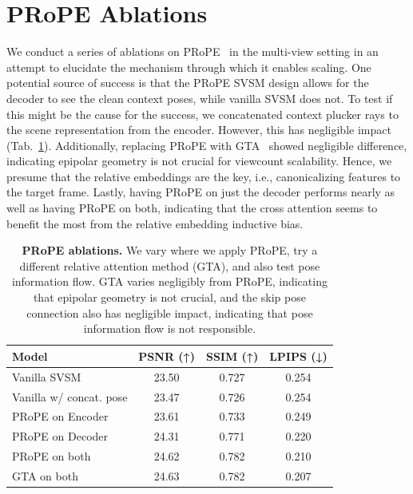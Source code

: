 \section{PRoPE Ablations}

We conduct a series of ablations on PRoPE~\cite{li2025cameras} in the multi-view setting in an attempt to elucidate the mechanism through which it enables scaling. One potential source of success is that the PRoPE SVSM design allows for the decoder to see the clean context poses, while vanilla SVSM does not. To test if this might be the cause for the success, we concatenated context plucker rays to the scene representation from the encoder. However, this has negligible impact (Tab.~\ref{tab:prope-abl-1}). Additionally, replacing PRoPE with GTA~\cite{miyato2023gta} showed negligible difference, indicating epipolar geometry is not crucial for viewcount scalability. Hence, we presume that the relative embeddings are the key, i.e., canonicalizing features to the target frame. Lastly, having PRoPE on just the decoder performs nearly as well as having PRoPE on both, indicating that the cross attention seems to benefit the most from the relative embedding inductive bias.

\begin{table}[h]
\footnotesize
\centering
\begin{tabular}{lccc}
\toprule
\textbf{Model} & \textbf{PSNR} (↑) & \textbf{SSIM} (↑) & \textbf{LPIPS} (↓)\\
\midrule
Vanilla SVSM & 23.50 & 0.727 & 0.254 \\
Vanilla w/ concat. pose & 23.47 & 0.726 & 0.254 \\
\midrule
PRoPE on Encoder & 23.61 & 0.733 & 0.249 \\
PRoPE on Decoder & 24.31 & 0.771 & 0.220\\
PRoPE on both & 24.62 & 0.782 & 0.210 \\
GTA on both & 24.63 & 0.782 & 0.207 \\
\bottomrule
\end{tabular}
\caption{\textbf{PRoPE ablations.} We vary where we apply PRoPE, try a different relative attention method (GTA), and also test pose information flow. GTA varies negligibly from PRoPE, indicating that epipolar geometry is not crucial, and the skip pose connection also has negligible impact, indicating that pose information flow is not responsible.}
\vspace{-1\baselineskip}
\label{tab:prope-abl-1}
\end{table}

